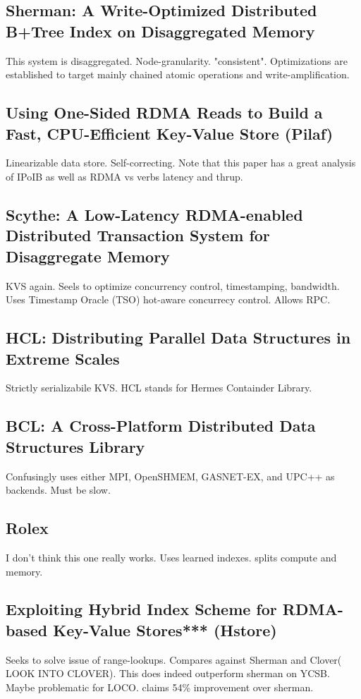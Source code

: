 \documentclass[sigplan,nonacm]{acmart}
\begin{document}
    \subsection{Sherman: A Write-Optimized Distributed B+Tree Index on Disaggregated Memory} %
    This system is disaggregated. Node-granularity. "consistent". Optimizations are established
    to target mainly chained atomic operations and write-amplification. \cite{Wang-SIGMOD-2022}

    \subsection{Using One-Sided RDMA Reads to Build a Fast, CPU-Efficient Key-Value Store (Pilaf) }
    Linearizable data store.  Self-correcting. Note that this paper has a great 
    analysis of IPoIB as well as RDMA vs verbs latency and thrup. \cite{Mitchell-ATC-2013}

    \subsection{Scythe: A Low-Latency RDMA-enabled Distributed Transaction System for Disaggregate Memory }
    KVS again. Seels to optimize concurrency control, timestamping, bandwidth. Uses Timestamp Oracle (TSO)
    hot-aware concurrecy control. Allows RPC. \cite{Lu-ACMtrans-2024}

    \subsection{HCL: Distributing Parallel Data Structures in Extreme Scales}
    Strictly serializabile KVS. HCL stands for Hermes Containder Library. \cite{Devarajan-CLUSTER-2020}

    \subsection{BCL: A Cross-Platform Distributed Data Structures Library}
    Confusingly uses either MPI, OpenSHMEM, GASNET-EX, and UPC++ as backends. Must be slow. \cite{Brock-ICPP-2019}
    
    \subsection{Rolex}
    I don't think this one really works. Uses learned indexes. splits compute and memory. \cite{Li-FAST-2023}

    \subsection{Exploiting Hybrid Index Scheme for RDMA-based Key-Value Stores*** (Hstore)}
    Seeks to solve issue of range-lookups. Compares against Sherman and Clover( LOOK INTO CLOVER). 
    This does indeed outperform sherman on YCSB. Maybe problematic for LOCO. claims 54\% improvement 
    over sherman.\cite{Han-SYSTOR-2023}
\end{document}
